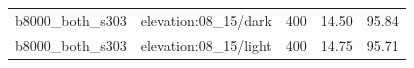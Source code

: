 \begin{longtable}{l>{\raggedright\arraybackslash}p{.42\linewidth}rrr}
b8000\_\allowbreak{}both\_\allowbreak{}s303 & %
elevation:08\_\allowbreak{}15/dark & %
400 & %
14.50 & %
95.84 \\ %

b8000\_\allowbreak{}both\_\allowbreak{}s303 & %
elevation:08\_\allowbreak{}15/light & %
400 & %
14.75 & %
95.71 \\ %


\end{longtable}
